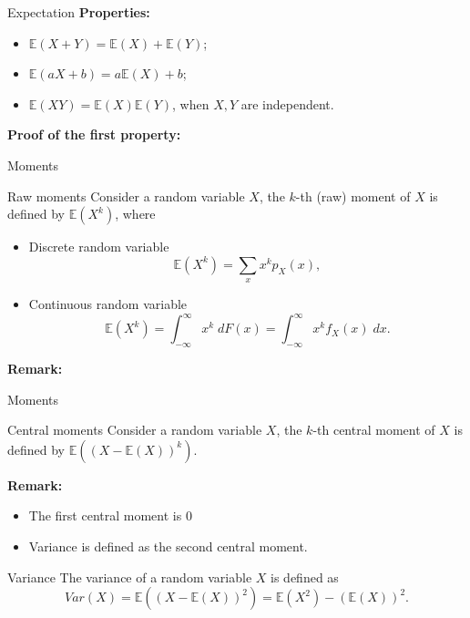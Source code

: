 \documentclass [aspectratio=169]{beamer}
\begin{document}
\begin{frame}{Expectation}
\textbf{Properties:} 
\begin{itemize}
    \item $\mathbb{E}(X+Y) = \mathbb{E}(X) + \mathbb{E}(Y)$;
    \item $\mathbb{E}(aX + b) = a\mathbb{E}(X) + b$;
    \item $\mathbb{E}(XY) = \mathbb{E}(X)\mathbb{E}(Y)$, when $X, Y$ are independent.
\end{itemize}
\vspace{0.1in}
\textbf{Proof of the first property:}
\vspace{1.5in}
\end{frame}


\begin{frame}{Moments}
\begin{block}{Raw moments}
Consider a random variable $X$, the $k$-th (raw) moment of $X$ is defined by $\mathbb{E}(X^k)$, where 
\begin{itemize}
    \item Discrete random variable
    $$
    \mathbb{E}(X^k) = \sum_{x}x^k p_X(x),
    $$
    \item Continuous random variable
    $$
    \mathbb{E}(X^k) = \int_{-\infty}^\infty x^k \;dF(x) = \int_{-\infty}^\infty x^kf_X(x)\;dx.
    $$
\end{itemize}
\end{block}
\vspace{0.1in}
\textbf{Remark:} \\
\vspace{0.5in}
\end{frame}

\begin{frame}{Moments}
\begin{block}{Central moments}
Consider a random variable $X$, the $k$-th central moment of $X$ is defined by $\mathbb{E}((X - \mathbb{E}(X))^k)$.
\end{block}
\vspace{0.1in}
\textbf{Remark:} \\
\begin{itemize}
    \item The first central moment is $0$
    \item Variance is defined as the second central moment.
\end{itemize}
\begin{block}{Variance}
The variance of a random variable $X$ is defined as
$$
Var(X) = \mathbb{E}((X - \mathbb{E}(X))^2) = \mathbb{E}(X^2) - (\mathbb{E}(X))^2.
$$
\end{block}
\end{frame}
\end{document}
